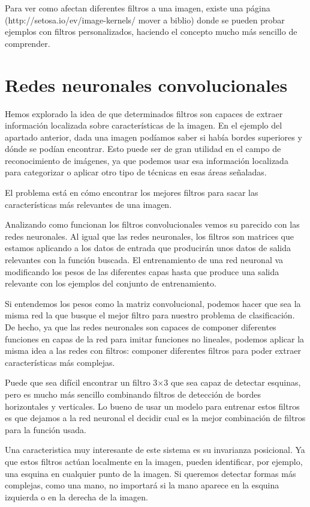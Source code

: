 Para ver como afectan diferentes filtros a una imagen, existe una página (http://setosa.io/ev/image-kernels/ mover a biblio) donde se pueden probar ejemplos con filtros personalizados, haciendo el concepto mucho más sencillo de comprender.

\section{Redes neuronales convolucionales}

Hemos explorado la idea de que determinados filtros son capaces de extraer información localizada sobre características de la imagen. En el ejemplo del apartado anterior, dada una imagen podíamos saber si había bordes superiores y dónde se podían encontrar. Esto puede ser de gran utilidad en el campo de reconocimiento de imágenes, ya que podemos usar esa información localizada para categorizar o aplicar otro tipo de técnicas en esas áreas señaladas.

El problema está en cómo encontrar los mejores filtros para sacar las características más relevantes de una imagen.

Analizando como funcionan los filtros convolucionales vemos su parecido con las redes neuronales. Al igual que las redes neuronales, los filtros son matrices que estamos aplicando a los datos de entrada que producirán unos datos de salida relevantes con la función buscada. El entrenamiento de una red neuronal va modificando los pesos de las diferentes capas hasta que produce una salida relevante con los ejemplos del conjunto de entrenamiento.

Si entendemos los pesos como la matriz convolucional, podemos hacer que sea la misma red la que busque el mejor filtro para nuestro problema de clasificación. De hecho, ya que las redes neuronales son capaces de componer diferentes funciones en capas de la red para imitar funciones no lineales, podemos aplicar la misma idea a las redes con filtros: componer diferentes filtros para poder extraer características más complejas.

Puede que sea difícil encontrar un filtro 3$\times$3 que sea capaz de detectar esquinas, pero es mucho más sencillo combinando filtros de detección de bordes horizontales y verticales. Lo bueno de usar un modelo para entrenar estos filtros es que dejamos a la red neuronal el decidir cual es la mejor combinación de filtros para la función usada.

Una caracteristica muy interesante de este sistema es su invarianza posicional. Ya que estos filtros actúan localmente en la imagen, pueden identificar, por ejemplo, una esquina en cualquier punto de la imagen. Si queremos detectar formas más complejas, como una mano, no importará si la mano aparece en la esquina izquierda o en la derecha de la imagen.


